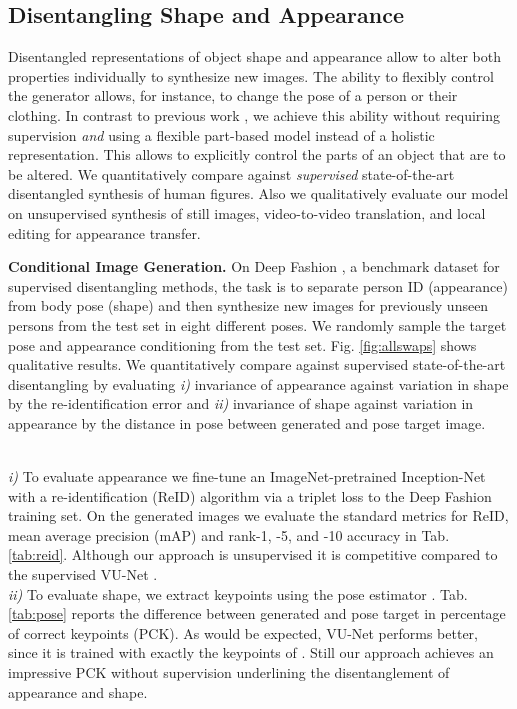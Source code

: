 \subsection{Disentangling Shape and Appearance}\label{sec:dis}
	
	Disentangled representations of object shape and appearance allow to alter both properties individually to synthesize new images. The ability to flexibly control the generator allows, for instance, to change the pose of a person or their clothing. In contrast to previous work \cite{Esser:2018ue, Denton:2017uf, Ma:2017uu, Ma:2017wq, deBem:2018wp, Jakab:2018wc},
	we achieve this ability without requiring supervision \textit{and} using a flexible part-based model instead of a holistic representation. This allows to explicitly control the parts of an object that are to be altered. We quantitatively compare against \emph{supervised} state-of-the-art disentangled synthesis of human figures. Also we qualitatively evaluate our model on unsupervised synthesis of still images, video-to-video translation, and local editing for appearance transfer.


	\textbf{Conditional Image Generation.}
	On Deep Fashion \cite{Liu:2015vj, Liu:2016vv}, a benchmark dataset for supervised disentangling methods, the task is to separate person ID (appearance) from body pose (shape) and then synthesize new images for previously unseen persons from the test set in eight different poses. We randomly sample the target pose and appearance conditioning from the test set. Fig. \ref{fig:allswaps} shows qualitative results.
	We quantitatively compare against supervised state-of-the-art disentangling \cite{Esser:2018ue} by evaluating \emph{i)} invariance of appearance against variation in shape by the re-identification error and \emph{ii)} invariance of shape against variation in appearance by the distance in pose between generated and pose target image.
	
	\\
	\emph{i)} To evaluate appearance we fine-tune an ImageNet-pretrained \cite{Russakovsky2015imagenet} Inception-Net \cite{Szegedy2015inception} with a re-identification (ReID) algorithm \cite{Xiao:2017} via a triplet loss \cite{Hermans:2017} to the Deep Fashion training set.
	On the generated images we evaluate the standard metrics for ReID, mean average precision (mAP) and rank-1, -5, and -10 accuracy in Tab. \ref{tab:reid}.
	Although our approach is unsupervised it is competitive compared to the supervised VU-Net \cite{Esser:2018ue}.
	\\
	\emph{ii)} To evaluate shape, we extract keypoints using the pose estimator \cite{Cao:2017vv}. Tab. \ref{tab:pose} reports the difference between generated and pose target in percentage of correct keypoints (PCK). As would be expected, VU-Net performs better, since it is trained with exactly the keypoints of \cite{Cao:2017vv}. Still our approach achieves an impressive PCK without supervision underlining the disentanglement of appearance and shape.


